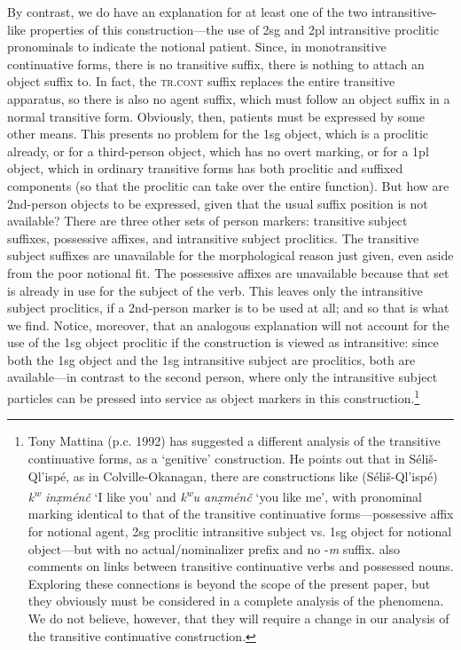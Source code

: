 \documentclass[output=paper,colorlinks,citecolor=brown]{langscibook}
\begin{document}
By contrast, we do have an explanation for at least one of the two
intransitive-like properties of this construction---the use of 2sg and
2pl intransitive proclitic pronominals to indicate the notional
patient.  Since, in monotransitive continuative forms, there is no
transitive suffix, there is nothing to attach an object suffix to.  In
fact, the \textsc{tr.cont} suffix replaces the entire transitive
apparatus, so there is also no agent suffix, which must follow an
object suffix in a normal transitive form.  Obviously, then, patients
must be expressed by some other means.  This presents no problem for
the 1sg object, which is a proclitic already, or for a third-person
object, which has no overt marking, or for a 1pl object, which in
ordinary transitive forms has both proclitic and suffixed components
(so that the proclitic can take over the entire function).  But how
are 2nd-person objects to be expressed, given that the usual suffix
position is not available?  There are three other sets of person
markers: transitive subject suffixes, possessive affixes, and
intransitive subject proclitics.  The transitive subject suffixes are
unavailable for the morphological reason just given, even aside from
the poor notional fit.  The possessive affixes are unavailable because
that set is already in use for the subject of the verb.  This leaves
only the intransitive subject proclitics, if a 2nd-person marker is to
be used at all; and so that is what we find.  Notice, moreover, that
an analogous explanation will not account for the use of the 1sg
object proclitic if the construction is viewed as intransitive: since
both the 1sg object and the 1sg intransitive subject are proclitics,
both are available---in contrast to the second person, where only the
intransitive subject particles can be pressed into service as object
markers in this construction.\footnote{Tony Mattina (p.c. 1992) has
suggested a different analysis of the transitive continuative forms,
as a `genitive' construction.  He points out that in
S\'eli\v{s}-Ql'isp\'e, as in Colville-Okanagan, there are
constructions like (S\'eli\v{s}-Ql'isp\'e) \emph{{k\textsuperscript w}
in\d{x}m\'en\v{c}} `I like you' and \emph{{k\textsuperscript w}u
an\d{x}m\'en\v{c}} `you like me', with pronominal marking identical to
that of the transitive continuative forms---possessive affix for
notional agent, 2sg proclitic intransitive subject vs. 1sg object for
notional object---but with no actual/nominalizer prefix and no
-\emph{m} suffix.  \citet[32]{Vogt:1940} also comments on links
between transitive continuative verbs and possessed nouns.  Exploring
these connections is beyond the scope of the present paper, but they
obviously must be considered in a complete analysis of the phenomena.
We do not believe, however, that they will require a change in our
analysis of the transitive continuative construction.  }
\end{document}
